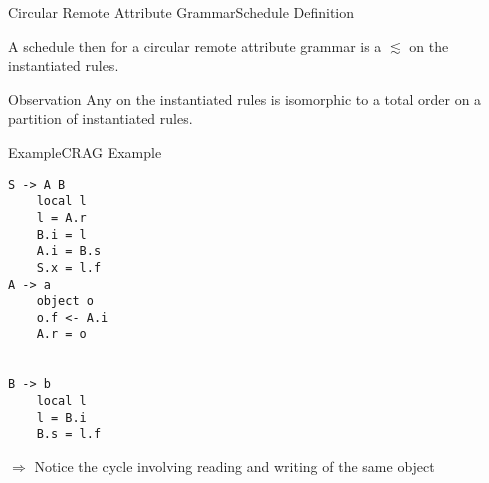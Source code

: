 \begin{frame}{Circular Remote Attribute Grammar}{Schedule Definition}
    
\begin{definition}
A schedule then for a circular remote attribute grammar is a \alert{\customorder{}} $\lesssim$ on the \alert{instantiated rules}.
\end{definition}

\begin{exampleblock}{Observation}
Any \customorder{} on the instantiated rules is isomorphic to a total order on a partition of instantiated rules.
\end{exampleblock}

\end{frame}




\begin{frame}[fragile=singleslide]{Example}{CRAG Example}

\begin{multicols}{3}
\begin{Verbatim}[fontsize=\small]
S -> A B
    local l
    l = A.r
    B.i = l
    A.i = B.s
    S.x = l.f
A -> a
    object o
    o.f <- A.i
    A.r = o


B -> b
    local l
    l = B.i
    B.s = l.f
\end{Verbatim}
\end{multicols}

\newlinevspace

$\Rightarrow$ Notice the \alert{cycle} involving reading and writing of the same object

\end{frame}




